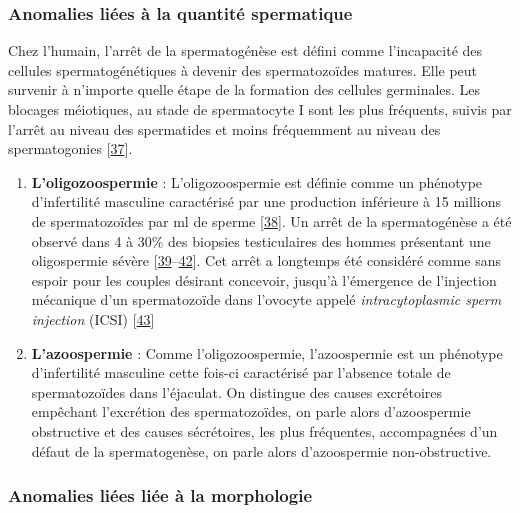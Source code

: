 \documentclass[12pt,twoside]{reedthesis}
\providecommand{\tightlist}{%
  \setlength{\itemsep}{0pt}\setlength{\parskip}{0pt}}
\theoremstyle{definition}
\theoremstyle{definition}
\theoremstyle{remark}
\begin{document}
  \newpage
  
  \subsubsection{Anomalies liées à la quantité
  spermatique}\label{infquant}
  
  Chez l'humain, l'arrêt de la spermatogénèse est défini comme
  l'incapacité des cellules spermatogénétiques à devenir des
  spermatozoïdes matures. Elle peut survenir à n'importe quelle étape de
  la formation des cellules germinales. Les blocages méiotiques, au stade
  de spermatocyte I sont les plus fréquents, suivis par l'arrêt au niveau
  des spermatides et moins fréquemment au niveau des spermatogonies
  {[}\protect\hyperlink{ref-Girgis}{37}{]}.
  
  \begin{enumerate}
  \def\labelenumi{\arabic{enumi}.}
  \tightlist
  \item
    \textbf{L'oligozoospermie} : L'oligozoospermie est définie comme un
    phénotype d'infertilité masculine caractérisé par une production
    inférieure à 15 millions de spermatozoïdes par ml de sperme
    {[}\protect\hyperlink{ref-Cooper2010}{38}{]}. Un arrêt de la
    spermatogénèse a été observé dans 4 à 30\% des biopsies testiculaires
    des hommes présentant une oligospermie sévère
    {[}\protect\hyperlink{ref-Colgan1980}{39}--\protect\hyperlink{ref-WONG1973}{42}{]}.
    Cet arrêt a longtemps été considéré comme sans espoir pour les couples
    désirant concevoir, jusqu'à l'émergence de l'injection mécanique d'un
    spermatozoïde dans l'ovocyte appelé \emph{intracytoplasmic sperm
    injection} (ICSI) {[}\protect\hyperlink{ref-Palermo1992}{43}{]}\\
  \item
    \textbf{L'azoospermie} : Comme l'oligozoospermie, l'azoospermie est un
    phénotype d'infertilité masculine cette fois-ci caractérisé par
    l'absence totale de spermatozoïdes dans l'éjaculat. On distingue des
    causes excrétoires empêchant l'excrétion des spermatozoïdes, on parle
    alors d'azoospermie obstructive et des causes sécrétoires, les plus
    fréquentes, accompagnées d'un défaut de la spermatogenèse, on parle
    alors d'azoospermie non-obstructive.
  \end{enumerate}
  
  \subsubsection{Anomalies liées liée à la
  morphologie}\label{anomalies-liees-liee-a-la-morphologie}
  
\end{document}
